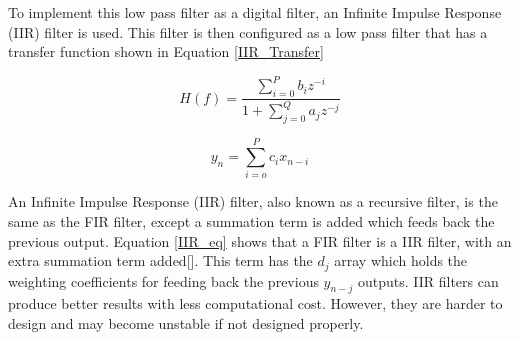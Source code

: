 

To implement this low pass filter as a digital filter, an Infinite Impulse Response (IIR) filter is used.  This filter is then configured as a low pass filter that has a transfer function shown in Equation \ref{IIR_Transfer}

\begin{equation}\label{IIR_Transfer}
H(f)=\frac{\displaystyle\sum\limits_{i=0}^{P} b_i z^{-i}}{1+\displaystyle\sum\limits_{j=0}^{Q} a_j z^{-j}}
\end{equation}


\begin{equation}\label{FIR_Eq}
y_n=\displaystyle\sum\limits_{i=o}^{P} c_ix_{n-i}
\end{equation} 

An Infinite Impulse Response (IIR) filter, also known as a recursive filter, is the same as the FIR filter, except a summation term is added which feeds back the previous output.  Equation \ref{IIR_eq} shows that a FIR filter is a IIR filter, with an extra summation term added[\cite{Cross}]. This term has the $d_j$ array which holds the weighting coefficients for feeding back the previous $y_{n-j}$ outputs.  IIR filters can produce better results with less computational cost.  However, they are harder to design and may become unstable if not designed properly.

